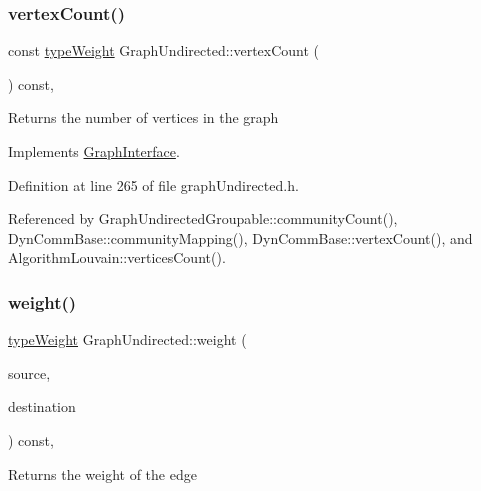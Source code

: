 \subsubsection{\texorpdfstring{vertex\+Count()}{vertexCount()}}
{\footnotesize\ttfamily const \hyperlink{edge_8h_a2e7ea3be891ac8b52f749ec73fee6dd2}{type\+Weight} Graph\+Undirected\+::vertex\+Count (\begin{DoxyParamCaption}{ }\end{DoxyParamCaption}) const\hspace{0.3cm}{\ttfamily [inline]}, {\ttfamily [virtual]}}

\begin{DoxyReturn}{Returns}
the number of vertices in the graph 
\end{DoxyReturn}


Implements \hyperlink{classGraphInterface_a483f64f8d37af2b363f2f4eb37943dfd}{Graph\+Interface}.



Definition at line 265 of file graph\+Undirected.\+h.



Referenced by Graph\+Undirected\+Groupable\+::community\+Count(), Dyn\+Comm\+Base\+::community\+Mapping(), Dyn\+Comm\+Base\+::vertex\+Count(), and Algorithm\+Louvain\+::vertices\+Count().

\mbox{\label{classGraphUndirected_ae40d431c92d8b4884c7915c44d42f356}} 
\subsubsection{\texorpdfstring{weight()}{weight()}}
{\footnotesize\ttfamily \hyperlink{edge_8h_a2e7ea3be891ac8b52f749ec73fee6dd2}{type\+Weight} Graph\+Undirected\+::weight (\begin{DoxyParamCaption}\item[{const \hyperlink{edge_8h_a5fbd20c46956d479cb10afc9855223f6}{type\+Vertex} \&}]{source,  }\item[{const \hyperlink{edge_8h_a5fbd20c46956d479cb10afc9855223f6}{type\+Vertex} \&}]{destination }\end{DoxyParamCaption}) const\hspace{0.3cm}{\ttfamily [inline]}, {\ttfamily [virtual]}}

\begin{DoxyReturn}{Returns}
the weight of the edge 
\end{DoxyReturn}


